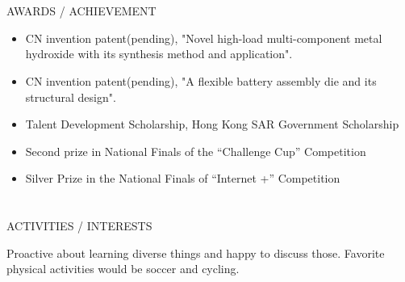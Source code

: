 \documentclass{my_cv}
\begin{document}
\begin{multicols}{2}
\section{\faStar}{AWARDS / ACHIEVEMENT}
\begin{itemize}[noitemsep]
    \item CN invention patent(pending), "Novel high-load multi-component metal hydroxide with its synthesis method and application".
    \item CN invention patent(pending), "A flexible battery
assembly die and its structural design".
    \item Talent Development Scholarship, Hong Kong SAR Government Scholarship
    \item Second prize in National Finals of the “Challenge Cup” Competition
    \item Silver Prize in the National Finals of “Internet +” Competition
\end{itemize}

\section{\faSoccerBallO}{ACTIVITIES / INTERESTS}

Proactive about learning diverse things and happy to discuss those. Favorite physical activities would be soccer and cycling.


\end{multicols}
\end{document}
